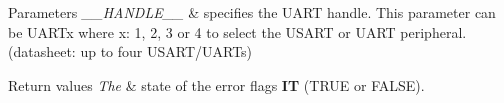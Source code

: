\begin{DoxyParams}{Parameters}
{\em \+\_\+\+\_\+\+H\+A\+N\+D\+L\+E\+\_\+\+\_\+} & specifies the U\+A\+RT handle. This parameter can be U\+A\+R\+Tx where x\+: 1, 2, 3 or 4 to select the U\+S\+A\+RT or U\+A\+RT peripheral. (datasheet\+: up to four U\+S\+A\+R\+T/\+U\+A\+R\+Ts) \\
\hline
\end{DoxyParams}

\begin{DoxyRetVals}{Return values}
{\em The} & state of the error flags {\bfseries IT} (T\+R\+UE or F\+A\+L\+SE). \\
\hline
\end{DoxyRetVals}
